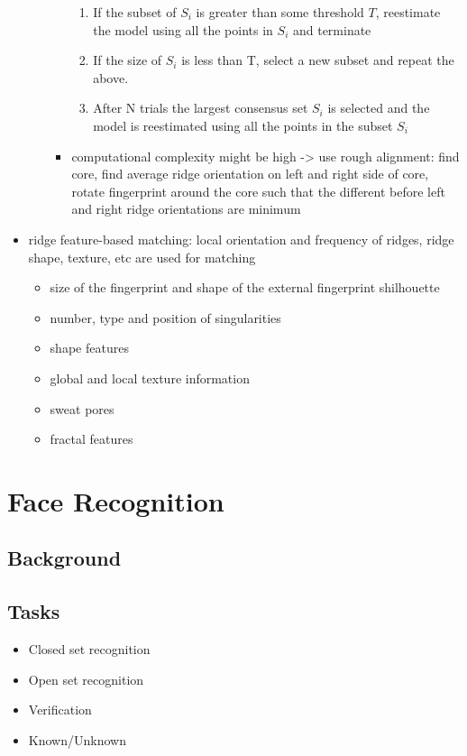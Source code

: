 \documentclass[paper=a4, fontsize=11pt]{scrartcl} %
\numberwithin{equation}{section} %
\numberwithin{figure}{section} %
\numberwithin{table}{section} %
\begin{document}
\begin{itemize}
\begin{itemize}
\begin{itemize}
\begin{enumerate}
\item If the subset of $S_i$ is greater than some threshold $T$, reestimate the model using all the points in $S_i$ and terminate
\item If the size of $S_i$ is less than T, select a new subset and repeat the above.
\item After N trials the largest consensus set $S_i$ is selected and the model is reestimated using all the points in the subset $S_i$
\end{enumerate}
\item computational complexity might be high -> use rough alignment: find core, find average ridge orientation on left and right side of core, rotate fingerprint around the core such that the different before left and right ridge orientations are minimum
\end{itemize}
\end{itemize}
\item ridge feature-based matching: local orientation and frequency of ridges, ridge shape, texture, etc are used for matching
\begin{itemize}
\item size of the fingerprint and shape of the external fingerprint shilhouette
\item number, type and position of singularities
\item shape features
\item global and local texture information
\item sweat pores
\item fractal features
\end{itemize}
\end{itemize}

\section{Face Recognition}

\subsection{Background}

\subsection{Tasks}

\begin{itemize}
\item Closed set recognition
\item Open set recognition
\item Verification
\item Known/Unknown
\end{itemize}
\end{document}
